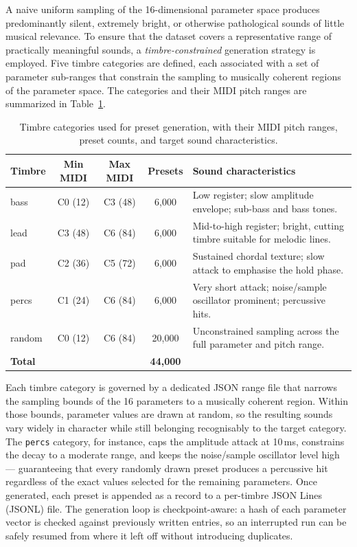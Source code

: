\noindent{}

A naive uniform sampling of the 16-dimensional parameter space produces predominantly silent, extremely bright, or otherwise pathological sounds of little musical relevance. To ensure that the dataset covers a representative range of practically meaningful sounds, a \textit{timbre-constrained} generation strategy is employed. Five timbre categories are defined, each associated with a set of parameter sub-ranges that constrain the sampling to musically coherent regions of the parameter space. The categories and their MIDI pitch ranges are summarized in Table~\ref{tab:timbre_categories}.

\begin{table}[H]
\centering
\renewcommand{\arraystretch}{1.3}
\begin{tabular}{lcccp{4.5cm}}
\hline
\textbf{Timbre} & \textbf{Min MIDI} & \textbf{Max MIDI} & \textbf{Presets} & \textbf{Sound characteristics} \\
\hline
bass   & C0 (12) & C3 (48) & 6{,}000  & Low register; slow amplitude envelope; sub-bass and bass tones. \\
lead   & C3 (48) & C6 (84) & 6{,}000  & Mid-to-high register; bright, cutting timbre suitable for melodic lines. \\
pad    & C2 (36) & C5 (72) & 6{,}000  & Sustained chordal texture; slow attack to emphasise the hold phase. \\
percs  & C1 (24) & C6 (84) & 6{,}000  & Very short attack; noise/sample oscillator prominent; percussive hits. \\
random & C0 (12) & C6 (84) & 20{,}000 & Unconstrained sampling across the full parameter and pitch range. \\
\hline
\textbf{Total} & & & \textbf{44{,}000} & \\
\hline
\end{tabular}
\vspace{0.3cm}
\caption{Timbre categories used for preset generation, with their MIDI pitch ranges, preset counts, and target sound characteristics.}
\label{tab:timbre_categories}
\end{table}

\noindent Each timbre category is governed by a dedicated JSON range file that narrows the sampling bounds of the 16 parameters to a musically coherent region. Within those bounds, parameter values are drawn at random, so the resulting sounds vary widely in character while still belonging recognisably to the target category. The \texttt{percs} category, for instance, caps the amplitude attack at 10\,ms, constrains the decay to a moderate range, and keeps the noise/sample oscillator level high — guaranteeing that every randomly drawn preset produces a percussive hit regardless of the exact values selected for the remaining parameters. Once generated, each preset is appended as a record to a per-timbre JSON Lines (JSONL) file. The generation loop is checkpoint-aware: a hash of each parameter vector is checked against previously written entries, so an interrupted run can be safely resumed from where it left off without introducing duplicates.

